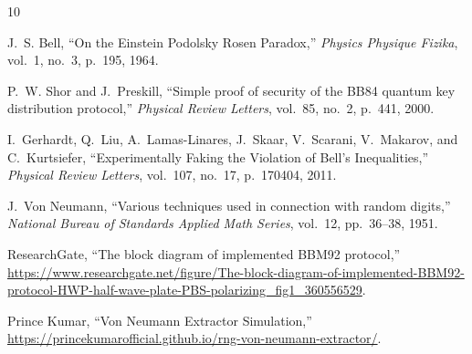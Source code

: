 \newpage
{}
\begin{thebibliography}{10}

J.~S. Bell,
\newblock ``On the Einstein Podolsky Rosen Paradox,''
\newblock \emph{Physics Physique Fizika}, vol.~1, no.~3, p.~195, 1964.

P.~W. Shor and J.~Preskill,
\newblock ``Simple proof of security of the BB84 quantum key distribution protocol,''
\newblock \emph{Physical Review Letters}, vol.~85, no.~2, p.~441, 2000.

I.~Gerhardt, Q.~Liu, A.~Lamas-Linares, J.~Skaar, V.~Scarani, V.~Makarov, and C.~Kurtsiefer,
\newblock ``Experimentally Faking the Violation of Bell’s Inequalities,''
\newblock \emph{Physical Review Letters}, vol.~107, no.~17, p.~170404, 2011.

J.~Von Neumann,
\newblock ``Various techniques used in connection with random digits,''
\newblock \emph{National Bureau of Standards Applied Math Series}, vol.~12, pp.~36--38, 1951.

ResearchGate,
\newblock ``The block diagram of implemented BBM92 protocol,''
\newblock \url{https://www.researchgate.net/figure/The-block-diagram-of-implemented-BBM92-protocol-HWP-half-wave-plate-PBS-polarizing_fig1_360556529}.

Prince Kumar,
\newblock ``Von Neumann Extractor Simulation,''
\newblock \url{https://princekumarofficial.github.io/rng-von-neumann-extractor/}.

\end{thebibliography}


